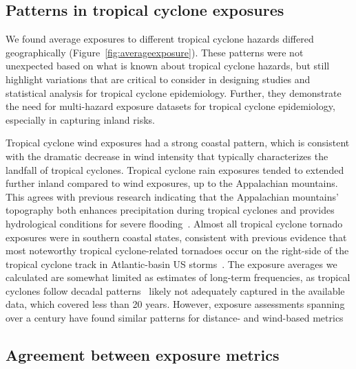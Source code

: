 \subsection*{Patterns in tropical cyclone exposures}

We found average exposures to different tropical cyclone hazards differed
geographically (Figure~\ref{fig:averageexposure}). These patterns were not
unexpected based on what is known about tropical cyclone hazards, but still
highlight variations that are critical to consider in designing studies and
statistical analysis for tropical cyclone epidemiology. Further, they
demonstrate the need for multi-hazard exposure datasets for tropical cyclone
epidemiology, especially in capturing inland risks. 

Tropical cyclone wind exposures had a strong coastal pattern, which is
consistent with the dramatic decrease in wind intensity that typically
characterizes the landfall of tropical cyclones.  Tropical cyclone rain
exposures tended to extended further inland compared to wind exposures, up to
the Appalachian mountains. This agrees with previous research indicating that
the Appalachian mountains' topography both enhances precipitation during
tropical cyclones and provides hydrological conditions for severe
flooding~\parencite{rees2001}.  Almost all tropical cyclone tornado exposures
were in southern coastal states, consistent with previous evidence that most
noteworthy tropical cyclone-related tornadoes occur on the right-side of the
tropical cyclone track in Atlantic-basin \ac{US} storms~\parencite{moore2012}.
The exposure averages we calculated are somewhat limited as estimates of
long-term frequencies, as tropical cyclones follow decadal
patterns~\parencite{kossin2007more} likely not adequately captured in the
available data, which covered less than 20 years. However, exposure assessments
spanning over a century have found similar patterns for distance- and
wind-based metrics~\parencite{zandbergen2009, kruk2010} 

\subsection*{Agreement between exposure metrics}

